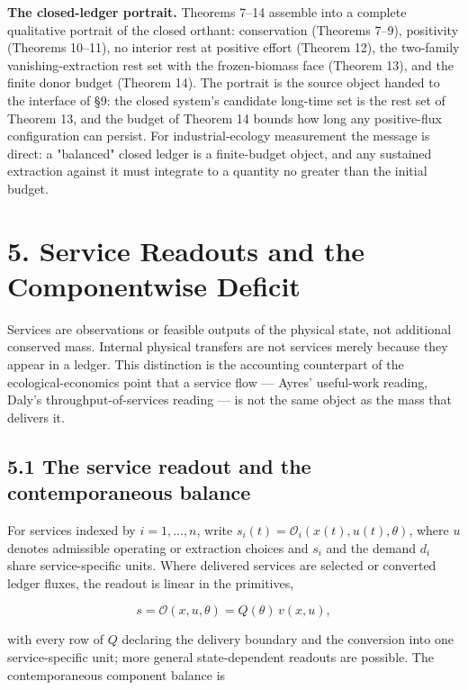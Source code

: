 \documentclass[11pt]{article}
\begin{document}
\textbf{The closed-ledger portrait.} Theorems 7--14 assemble into a complete qualitative portrait of the closed orthant: conservation (Theorems 7--9), positivity (Theorems 10--11), no interior rest at positive effort (Theorem 12), the two-family vanishing-extraction rest set with the frozen-biomass face (Theorem 13), and the finite donor budget (Theorem 14). The portrait is the source object handed to the interface of \S9: the closed system's candidate long-time set is the rest set of Theorem 13, and the budget of Theorem 14 bounds how long any positive-flux configuration can persist. For industrial-ecology measurement the message is direct: a "balanced" closed ledger is a finite-budget object, and any sustained extraction against it must integrate to a quantity no greater than the initial budget.

\vspace{0.8em}

\section*{5. Service Readouts and the Componentwise Deficit}\label{5-service-readouts-and-the-componentwise-deficit}

Services are observations or feasible outputs of the physical state, not additional conserved mass. Internal physical transfers are not services merely because they appear in a ledger. This distinction is the accounting counterpart of the ecological-economics point that a service flow --- Ayres' useful-work reading, Daly's throughput-of-services reading --- is not the same object as the mass that delivers it.

\subsection*{5.1 The service readout and the contemporaneous balance}\label{51-the-service-readout-and-the-contemporaneous-balance}

For services indexed by \(i = 1, \ldots, n\), write \(s_i(t) =\allowbreak{} \mathcal{O}_i(x(t),\allowbreak{} u(t),\allowbreak{} \theta)\), where \(u\) denotes admissible operating or extraction choices and \(s_i\) and the demand \(d_i\) share service-specific units. Where delivered services are selected or converted ledger fluxes, the readout is linear in the primitives, 

$$s = \mathcal{O}(x, u, \theta) = Q(\theta)\, v(x, u),$$

 with every row of \(Q\) declaring the delivery boundary and the conversion into one service-specific unit; more general state-dependent readouts are possible. The contemporaneous component balance is 
\end{document}
